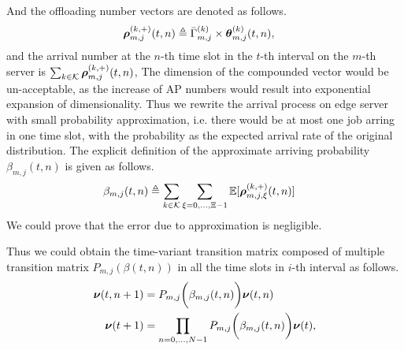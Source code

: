 And the offloading number vectors are denoted as follows.
\begin{align}
    \boldsymbol{\rho}^{(k,+)}_{m,j}({t,n}) &\triangleq \bar{\Gamma}^{(k)}_{m,j} \times \boldsymbol{\theta}^{(k)}_{m,j}({t,n}),
\end{align}
and the arrival number at the $n$-th time slot in the $t$-th interval on the $m$-th server is $\sum_{k\in\mathcal{K}} \boldsymbol{\rho}^{(k,+)}_{m,j}({t,n})$,
The dimension of the compounded vector would be un-acceptable, as the increase of AP numbers would result into exponential expansion of dimensionality.
Thus we rewrite the arrival process on edge server with small probability approximation, i.e. there would be at most one job arring in one time slot, with the probability as the expected arrival rate of the original distribution. The explicit definition of the approximate arriving probability $\beta_{m,j}({t,n})$ is given as follows.
\begin{align}
    {\beta}_{m,j}({t,n}) &\triangleq \sum_{k\in\mathcal{K}} \sum_{\xi=0,\dots,\Xi-1} \mathbb{E}[\boldsymbol{\rho}^{(k,+)}_{m,j,\xi}({t,n})]
    \label{eqn_0}
\end{align}
We could prove that the error due to approximation is negligible.


Thus we could obtain the time-variant transition matrix composed of multiple transition matrix $P_{m,j}(\beta({t,n}))$ in all the time slots in $i$-th interval as follows.
\begin{align}
    \boldsymbol{\nu}({t,n+1}) &= P_{m,j}\bigg(\beta_{m,j}({t,n})\bigg) \boldsymbol{\nu}({t,n})
    \\
    \boldsymbol{\nu}({t+1}) &= \prod_{n=0,\dots,N-1} P_{m,j}\bigg(\beta_{m,j}({t,n})\bigg) \boldsymbol{\nu}({t}),
    \label{eqn_4}
\end{align}

